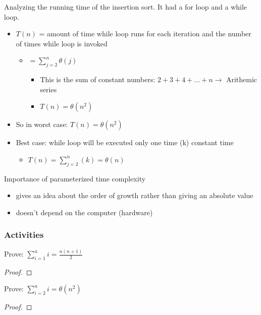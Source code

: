 \documentclass{article}
\begin{document}
    Analyzing the running time of the insertion sort. It had a for loop and a while loop. 
    \begin{itemize}
        \item $T(n)$ = amount of time while loop runs for each iteration and the 
        number of times while loop is invoked
        \begin{itemize}
            \item $=\sum^n_{j=2}\theta(j)$
            \begin{itemize}
                \item This is the sum of constant numbers: $2+3+4+...+n\rightarrow$
                Arithemic series
                \item $T(n)=\theta(n^2)$
            \end{itemize}
        \end{itemize}
        \item So in worst case: $T(n)=\theta(n^2)$
        \item Best case: while loop will be executed only one time (k) constant time 
        \begin{itemize}
            \item $T(n)=\sum_{j=2}^n(k)=\theta(n)$
        \end{itemize}
    \end{itemize}

    Importance of parameterized time complexity
    \begin{itemize}
        \item gives an idea about the order of growth rather than giving an absolute value
        \item doesn't depend on the computer (hardware)
    \end{itemize}

    \subsubsection*{Activities}

    Prove: $\sum_{i=1}^n i = \frac{n(n+1)}{2}$
    \begin{proof}
        
    \end{proof}

    Prove: $\sum_{i=2}^n i = \theta(n^2)$ 
    \begin{proof}
        
    \end{proof}
\end{document}
